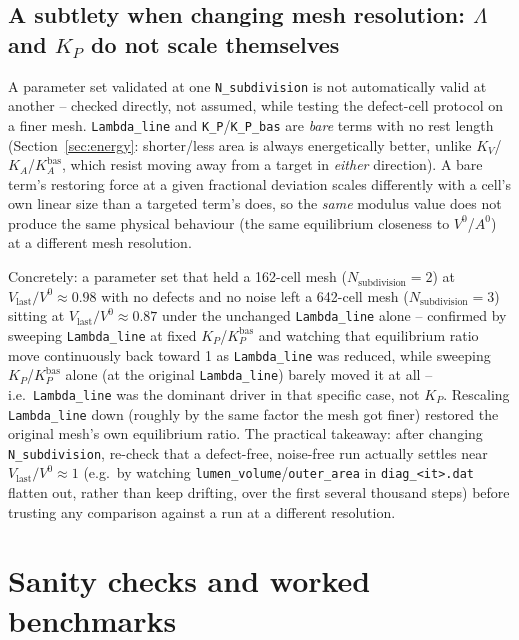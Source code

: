 \documentclass[11pt,a4paper]{report}
\begin{document}
\subsection{A subtlety when changing mesh resolution: $\Lambda$ and $K_P$ do not scale themselves}
\label{sec:resolution-scaling}
A parameter set validated at one \texttt{N\_subdivision} is not
automatically valid at another -- checked directly, not assumed, while
testing the defect-cell protocol on a finer mesh. \texttt{Lambda\_line}
and \texttt{K\_P}/\texttt{K\_P\_bas} are \emph{bare} terms with no rest
length (Section~\ref{sec:energy}: shorter/less area is always
energetically better, unlike $K_V$/$K_A$/$K_A^{\mathrm{bas}}$, which
resist moving away from a target in \emph{either} direction). A bare
term's restoring force at a given fractional deviation scales
differently with a cell's own linear size than a targeted term's does,
so the \emph{same} modulus value does not produce the same physical
behaviour (the same equilibrium closeness to $V^0$/$A^0$) at a
different mesh resolution.

Concretely: a parameter set that held a 162-cell mesh
($N_{\mathrm{subdivision}}=2$) at $V_{\mathrm{last}}/V^0\approx0.98$
with no defects and no noise left a 642-cell mesh
($N_{\mathrm{subdivision}}=3$) sitting at $V_{\mathrm{last}}/V^0\approx0.87$
under the unchanged \texttt{Lambda\_line} alone -- confirmed by sweeping
\texttt{Lambda\_line} at fixed $K_P$/$K_P^{\mathrm{bas}}$ and watching
that equilibrium ratio move continuously back toward 1 as
\texttt{Lambda\_line} was reduced, while sweeping $K_P$/$K_P^{\mathrm{bas}}$
alone (at the original \texttt{Lambda\_line}) barely moved it at all --
i.e.\ \texttt{Lambda\_line} was the dominant driver in that specific
case, not $K_P$. Rescaling \texttt{Lambda\_line} down (roughly by the
same factor the mesh got finer) restored the original mesh's own
equilibrium ratio. The practical takeaway: after changing
\texttt{N\_subdivision}, re-check that a defect-free, noise-free run
actually settles near $V_{\mathrm{last}}/V^0\approx1$ (e.g.\ by
watching \texttt{lumen\_volume}/\texttt{outer\_area} in
\texttt{diag\_<it>.dat} flatten out, rather than keep drifting, over
the first several thousand steps) before trusting any comparison
against a run at a different resolution.

\section{Sanity checks and worked benchmarks}
\label{sec:code-sanity}
\end{document}
